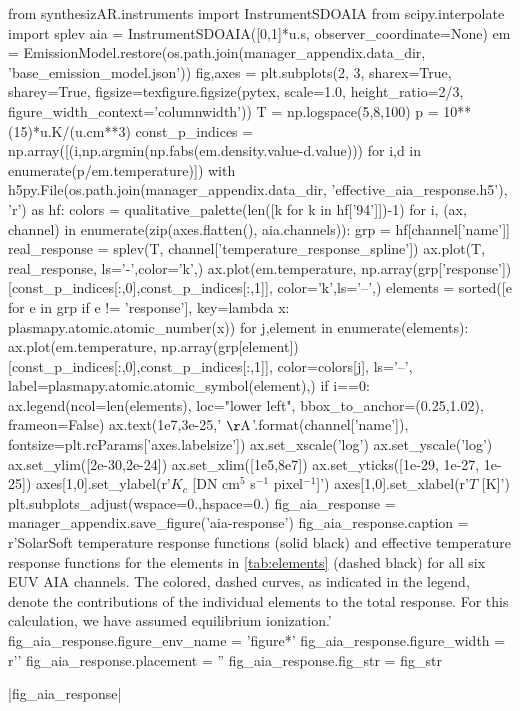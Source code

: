 \begin{pycode}
from synthesizAR.instruments import InstrumentSDOAIA
from scipy.interpolate import splev
aia = InstrumentSDOAIA([0,1]*u.s, observer_coordinate=None)
em = EmissionModel.restore(os.path.join(manager_appendix.data_dir, 'base_emission_model.json'))
fig,axes = plt.subplots(2, 3, sharex=True, sharey=True,
                        figsize=texfigure.figsize(pytex, scale=1.0, height_ratio=2/3,       
                                                  figure_width_context='columnwidth'))
T = np.logspace(5,8,100)
p = 10**(15)*u.K/(u.cm**3)
const_p_indices = np.array([(i,np.argmin(np.fabs(em.density.value-d.value))) 
                            for i,d in enumerate(p/em.temperature)])
with h5py.File(os.path.join(manager_appendix.data_dir, 'effective_aia_response.h5'), 'r') as hf:
    colors = qualitative_palette(len([k for k in hf['94']])-1)
    for i, (ax, channel) in enumerate(zip(axes.flatten(), aia.channels)):
        grp = hf[channel['name']]
        real_response = splev(T, channel['temperature_response_spline'])
        ax.plot(T, real_response, ls='-',color='k',)
        ax.plot(em.temperature, 
                np.array(grp['response'])[const_p_indices[:,0],const_p_indices[:,1]],
                color='k',ls='--',)
        elements = sorted([e for e in grp if e != 'response'],
                            key=lambda x: plasmapy.atomic.atomic_number(x))
        for j,element in enumerate(elements):
            ax.plot(em.temperature, 
                    np.array(grp[element])[const_p_indices[:,0],const_p_indices[:,1]],
                    color=colors[j], ls='--', label=plasmapy.atomic.atomic_symbol(element),)
        if i==0:
            ax.legend(ncol=len(elements), loc="lower left", bbox_to_anchor=(0.25,1.02),
                        frameon=False)
        ax.text(1e7,3e-25,'{} $\mathrm{{\AA}}$'.format(channel['name']),
                fontsize=plt.rcParams['axes.labelsize'])
ax.set_xscale('log')
ax.set_yscale('log')
ax.set_ylim([2e-30,2e-24])
ax.set_xlim([1e5,8e7])
ax.set_yticks([1e-29, 1e-27, 1e-25])
axes[1,0].set_ylabel(r'$K_c$ [DN cm$^5$ s$^{-1}$ pixel$^{-1}$]')
axes[1,0].set_xlabel(r'$T$ [K]')
plt.subplots_adjust(wspace=0.,hspace=0.)
fig_aia_response = manager_appendix.save_figure('aia-response')
fig_aia_response.caption = r'SolarSoft temperature response functions (solid black) and effective temperature response functions for the elements in \autoref{tab:elements} (dashed black) for all six EUV AIA channels. The colored, dashed curves, as indicated in the legend, denote the contributions of the individual elements to the total response. For this calculation, we have assumed equilibrium ionization.'
fig_aia_response.figure_env_name = 'figure*'
fig_aia_response.figure_width = r'\columnwidth'
fig_aia_response.placement = ''
fig_aia_response.fig_str = fig_str
\end{pycode}
|fig_aia_response|

